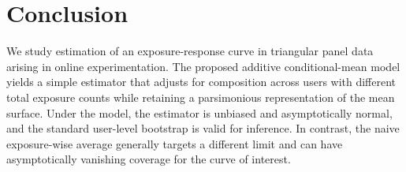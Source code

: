 \documentclass[sigconf,anonymous,review]{acmart}
\begin{document}
\section{Conclusion}

We study estimation of an exposure-response curve in triangular panel data arising in online experimentation. The proposed additive conditional-mean model yields a simple estimator that adjusts for composition across users with different total exposure counts while retaining a parsimonious representation of the mean surface. Under the model, the estimator is unbiased and asymptotically normal, and the standard user-level bootstrap is valid for inference. In contrast, the naive exposure-wise average generally targets a different limit and can have asymptotically vanishing coverage for the curve of interest.



\end{document}

